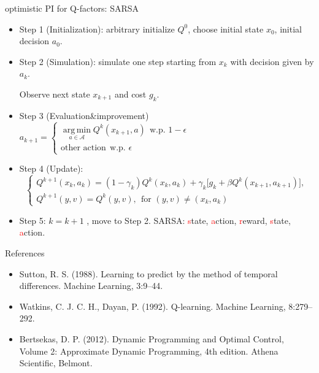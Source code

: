 \documentclass{beamer}
\def\A{{\mathcal A}}
\newcommand{\red}[1]{\textcolor{red}{#1}}
\DeclareMathOperator*{\argmin}{arg\,min}
\begin{document}
\begin{frame}{optimistic PI for Q-factors: SARSA}
\begin{itemize}
  \item Step 1 (Initialization): arbitrary initialize $Q^0$, choose initial state $x_0$, initial decision $a_0.$
  \item Step 2 (Simulation): simulate one step starting from $x_k$ with decision given by $a_k$.

Observe next state $x_{k+1}$ and cost $g_k$.

\item Step 3 (Evaluation\&improvement) $a_{k+1} = \begin{cases}\argmin\limits_{a\in \A} Q^k(x_{k+1},a) ~~\text{w.p. }1-\epsilon\\ \text{other action} ~~\text{w.p. }\epsilon \end{cases}$
  \item Step 4 (Update): \begin{equation*}
  \begin{cases}
  Q^{k+1}(x_k, a_k) =  (1-\gamma_k) Q^k(x_{k}, a_k) + \gamma_k \Big [g_k+ \beta Q^k(x_{k+1}, a_{k+1}) \Big],\\
  Q^{k+1}(y, v) = Q^{k}(y, v),~~\text{for }(y, v)\neq (x_k, a_k)
  \end{cases}
  \end{equation*}
  \item Step 5: $k = k+1$ , move to Step 2. \quad SARSA: \red{s}tate, \red{a}ction, \red{r}eward, \red{s}tate, \red{a}ction.
\end{itemize}

\end{frame}



\begin{frame}{References}
\begin{itemize}
  \item Sutton, R. S. (1988). Learning to predict by the method of temporal differences. Machine Learning, 3:9--44.
  \item Watkins, C. J. C. H., Dayan, P. (1992). Q-learning. Machine Learning, 8:279--292.
  \item Bertsekas, D. P. (2012). Dynamic Programming and Optimal Control, Volume 2: Approximate Dynamic
Programming, 4th edition. Athena Scientific, Belmont.


\end{itemize}
\end{frame}
\end{document}
